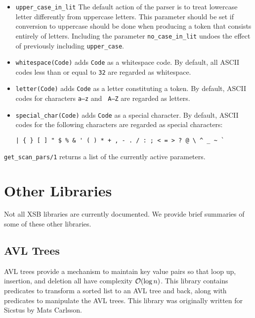 \begin{description}
\begin{itemize}
\item{{\tt upper\_case\_in\_lit}} The default action of the parser is
to treat lowercase letter differently from uppercase letters.  This
parameter should be set if conversion to uppercase should be done when
producing a token that consists entirely of letters.  Including the
parameter {\tt no\_case\_in\_lit} undoes the effect of previously
including {\tt upper\_case}.

\item{{\tt whitespace(Code)}} adds {\tt Code} as a whitespace code.
By default, all ASCII codes less than or equal to {\tt 32} are
regarded as whitespace.

\item{{\tt letter(Code)}} adds {\tt Code} as a letter constituting a
token. By default, ASCII codes for characters {\tt a--z} and {\tt
A--Z} are regarded as letters.

\item{{\tt special\_char(Code)}} adds {\tt Code} as a special
  character.  By default, ASCII codes for the following characters are
  regarded as special characters:

\begin{verbatim}
| { } [ ] " $ % & ' ( ) * + , - . / : ; < = > ? @ \ ^ _ ~ `
\end{verbatim}
\end{itemize}

{\tt get\_scan\_pars/1} returns a list of the currently active
parameters.

\end{description} 

\section{Other Libraries}

Not all XSB libraries are currently documented.  We provide brief
summaries of some of these other libraries.

\subsection{AVL Trees}

AVL trees provide a mechanism to maintain key value pairs so that loop
up, insertion, and deletion all have complexity ${\cal O}(\log n)$.  This
library contains predicates to transform a sorted list to an AVL tree
and back, along with predicates to manipulate the AVL trees.  This
library was originally written for Sicstus by Mats Carlsson.


